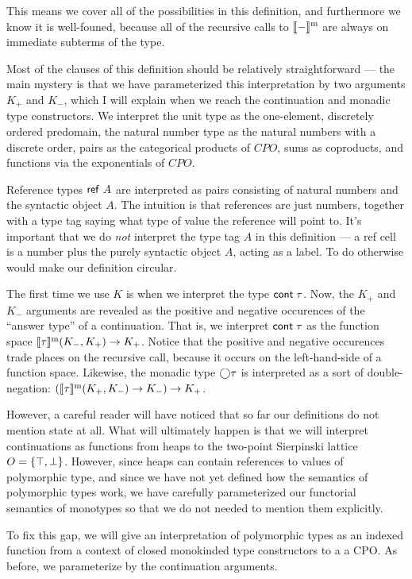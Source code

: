 \documentclass[12pt]{article}
\begin{document}
This means we cover all of the possibilities in this definition, and
furthermore we know it is well-founed, because all of the recursive
calls to $[\![{-}]\!]^{\mathrm{m}}$ are always on immediate subterms of the
type.

Most of the clauses of this definition should be relatively
straightforward --- the main mystery is that we have parameterized this
interpretation by two arguments $K_+$ and $K_-$, which I will explain
when we reach the continuation and monadic type constructors. 
We interpret the unit type as the one-element, discretely ordered
predomain, the natural number type as the natural numbers with a
discrete order, pairs as the categorical products of $CPO$, sums as
coproducts, and functions via the exponentials of $CPO$.

Reference types $\mbox{\textsf{{ref }}}A$ are interpreted as pairs consisting of
natural numbers and the syntactic object $A$. The intuition is that
references are just numbers, together with a type tag saying what
type of value the reference will point to. It's important that we do 
\emph{not} interpret the type tag $A$ in this definition --- a ref cell
is a number plus the purely syntactic object $A$, acting as a label. 
To do otherwise would make our definition circular. 

The first time we use $K$ is when we interpret the type $\mbox{\textsf{{cont}}}\;{\tau}$.
Now, the $K_+$ and $K_-$ arguments are revealed as the positive and
negative occurences of the ``answer type'' of a continuation. That is,
we interpret $\mbox{\textsf{{cont}}}\;{\tau}$ as the function space
$[\![{\tau}]\!]^{\mathrm{m}}(K_-, K_+) \to K_+$.  Notice that the positive and
negative occurences trade places on the recursive call, because it
occurs on the left-hand-side of a function space. Likewise, the
monadic type $\bigcirc{\tau}$ is interpreted as a sort of
double-negation: $([\![{\tau}]\!]^{\mathrm{m}}(K_+, K_-) \to K_-) \to K_+$.

However, a careful reader will have noticed that so far our
definitions do not mention state at all. What will ultimately happen
is that we will interpret continuations as functions from heaps to the
two-point Sierpinski lattice $O = \{{\top, \bot}\}$. However, since
heaps can contain references to values of polymorphic type, and since
we have not yet defined how the semantics of polymorphic types work, we
have carefully parameterized our functorial semantics of monotypes so
that we do not needed to mention them explicitly. 

To fix this gap, we will give an interpretation of polymorphic types
as an indexed function from a context of closed monokinded type
constructors to a a CPO.  As before, we parameterize by the
continuation arguments.
\end{document}
